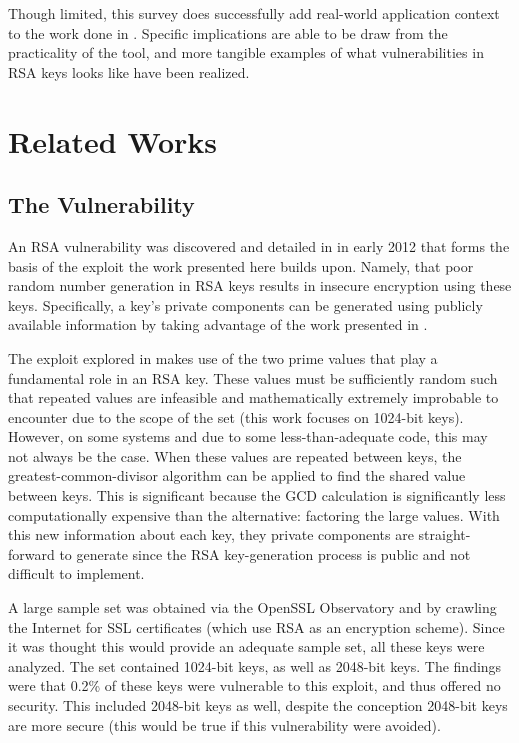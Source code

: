 \documentclass[12pt]{ucthesis}
\begin{document}
Though limited, this survey does successfully add real-world application
context to the work done in \cite{scharfglass2012breaking}. Specific
implications are able to be draw from the practicality of the tool, and more
tangible examples of what vulnerabilities in RSA keys looks like have been
realized.


\chapter{Related Works}
\label{related}

\section{The Vulnerability}
\label{sec:vuln}
An RSA vulnerability was discovered and detailed in \cite{lenstra2012ron} in
early 2012 that forms the basis of the exploit the work presented here builds
upon. Namely, that poor random number generation in RSA keys results in
insecure encryption using these keys. Specifically, a key's private components
can be generated using publicly available information by taking advantage of
the work presented in \cite{scharfglass2012breaking}.

The exploit explored in \cite{lenstra2012ron} makes use of the two prime
values that play a fundamental role in an RSA key. These values must be
sufficiently random such that repeated values are infeasible and mathematically
extremely improbable to encounter due to the scope of the set (this work
focuses on 1024-bit keys). However, on some systems and due to some
less-than-adequate code, this may not always be the case. When these values are
repeated between keys, the greatest-common-divisor algorithm can be applied to
find the shared value between keys. This is significant because the GCD
calculation is significantly less computationally expensive than the
alternative: factoring the large values. With this new information about each key,
they private components are straight-forward to generate since the RSA
key-generation process is public and not difficult to implement.

A large sample set was obtained via the OpenSSL Observatory and by crawling the
Internet for SSL certificates (which use RSA as an encryption scheme). Since it
was thought this would provide an adequate sample set, all these keys were
analyzed. The set contained 1024-bit keys, as well as 2048-bit keys. The
findings were that 0.2\% of these keys were vulnerable to this exploit, and
thus offered no security. This included 2048-bit keys as well, despite the
conception 2048-bit keys are more secure (this would be true if this
vulnerability were avoided).
\end{document}
